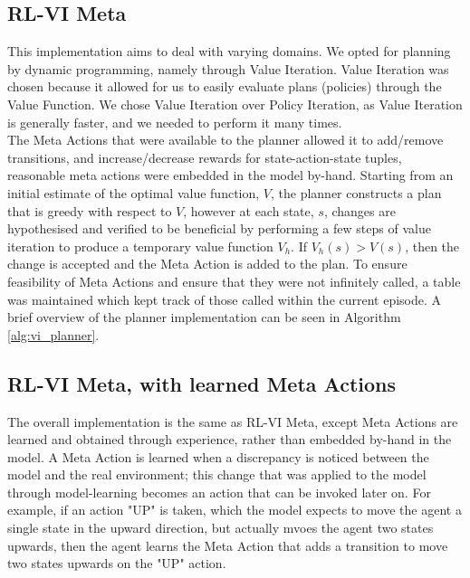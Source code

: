 \subsection{RL-VI Meta}
This implementation aims to deal with varying domains. We opted for planning by dynamic programming, namely through Value Iteration. Value Iteration was chosen because it allowed for us to easily evaluate plans (policies) through the Value Function. We chose Value Iteration over Policy Iteration, as Value Iteration is generally faster, and we needed to perform it many times.
\\The Meta Actions that were available to the planner allowed it to add/remove transitions, and increase/decrease rewards for state-action-state tuples, reasonable meta actions were embedded in the model by-hand. Starting from an initial estimate of the optimal value function, $V$, the planner constructs a plan that is greedy with respect to $V$, however at each state, $s$, changes are hypothesised and verified to be beneficial by performing a few steps of value iteration to produce a temporary value function $V_h$. If $V_h(s) > V(s)$, then the change is accepted and the Meta Action is added to the plan.
To ensure feasibility of Meta Actions and ensure that they were not infinitely called, a table was maintained which kept track of those called within the current episode. A brief overview of the planner implementation can be seen in Algorithm \ref{alg:vi_planner}.
\subsection{RL-VI Meta, with learned Meta Actions}
The overall implementation is the same as RL-VI Meta, except Meta Actions are learned and obtained through experience, rather than embedded by-hand in the model. A Meta Action is learned when a discrepancy is noticed between the model and the real environment; this change that was applied to the model through model-learning becomes an action that can be invoked later on. For example, if an action "UP" is taken, which the model expects to move the agent a single state in the upward direction, but actually mvoes the agent two states upwards, then the agent learns the Meta Action that adds a transition to move two states upwards on the "UP" action.


